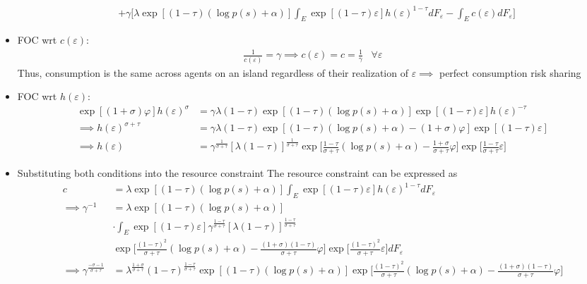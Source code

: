\documentclass{article}
\begin{document}
\begin{itemize}
\begin{align*}
&+ \gamma \Bigg[\lambda \exp [(1-\tau)(\log p(s)+ \alpha)] \int_E \exp [(1-\tau) \varepsilon] h(\varepsilon)^{1-\tau} dF_\varepsilon - \int_E c(\varepsilon) dF_\varepsilon \Bigg]
\end{align*}
\item FOC wrt $c(\varepsilon)$:
\begin{align*}
\frac{1}{c(\varepsilon)} = \gamma \implies c(\varepsilon) = c = \frac{1}{\gamma} \;\;\; \forall \varepsilon
\end{align*}
Thus, consumption is the same across agents on an island regardless of their realization of $\varepsilon \implies$ perfect consumption risk sharing
\item FOC wrt $h(\varepsilon)$:
\begin{align*}
\exp[(1+\sigma) \varphi] h(\varepsilon)^{\sigma} &= \gamma \lambda (1-\tau) \exp [(1-\tau)(\log p(s)+ \alpha)]  \exp [(1-\tau) \varepsilon] h(\varepsilon)^{-\tau} \\
\implies
h(\varepsilon)^{\sigma+\tau} &= \gamma \lambda (1-\tau) \exp [(1-\tau)(\log p(s)+ \alpha)-(1+\sigma) \varphi]  \exp [(1-\tau) \varepsilon] \\
\implies
h(\varepsilon) &= \gamma^{\frac{1}{\sigma+\tau}} [\lambda (1-\tau)]^{\frac{1}{\sigma+\tau}} \exp \Bigg[\frac{1-\tau}{\sigma +\tau}(\log p(s)+ \alpha)-\frac{1+\sigma}{\sigma+\tau} \varphi \Bigg]  \exp  \Bigg[\frac{1-\tau}{\sigma+\tau} \varepsilon  \Bigg]
\end{align*}
\item Substituting both conditions into the resource constraint
The resource constraint can be expressed as
\begin{align*}
c
&= \lambda \exp [(1-\tau)(\log p(s)+ \alpha)] \int_E \exp [(1-\tau) \varepsilon] h(\varepsilon)^{1-\tau} dF_\varepsilon \\
\implies
\gamma^{-1}
&= \lambda \exp [(1-\tau)(\log p(s)+ \alpha)] \\
&\cdot \int_E \exp [(1-\tau) \varepsilon]  \gamma^{\frac{1 - \tau}{\sigma+\tau}} [\lambda (1-\tau)]^{\frac{1 - \tau}{\sigma+\tau}} \\&\exp \Bigg[\frac{(1-\tau)^2}{\sigma +\tau}(\log p(s)+ \alpha)-\frac{(1+\sigma)(1-\tau)}{\sigma+\tau} \varphi \Bigg]  \exp  \Bigg[\frac{(1-\tau)^2}{\sigma+\tau} \varepsilon  \Bigg] dF_\varepsilon\\
\implies
\gamma^{\frac{-\sigma -1 }{\sigma+\tau}}
&= \lambda^{\frac{1+\sigma}{\sigma +\tau}}  (1-\tau)^{\frac{1 - \tau}{\sigma+\tau}} \exp [(1-\tau)( \log p(s)+ \alpha)]   \exp \Bigg[\frac{(1-\tau)^2}{\sigma +\tau}(\log p(s)+ \alpha)-\frac{(1+\sigma)(1-\tau)}{\sigma+\tau} \varphi \Bigg]\\

\end{align*}
\end{itemize}
\end{document}
